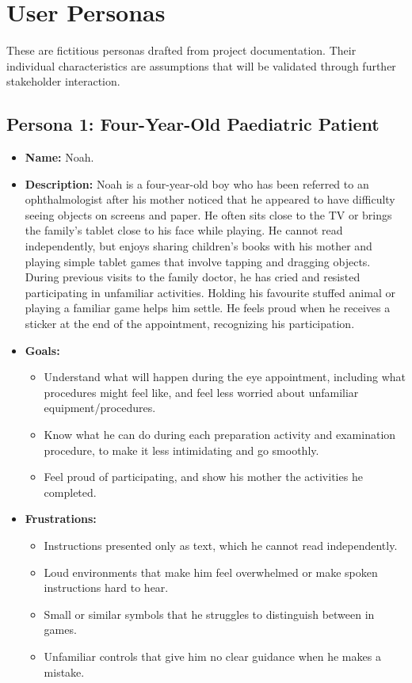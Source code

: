 \documentclass[10pt]{article}
\begin{document}
\section{User Personas}
\label{sec_Personas}
These are fictitious personas drafted from project documentation.
Their individual characteristics are assumptions that will be validated through further stakeholder interaction.

\subsection{Persona 1: Four-Year-Old Paediatric Patient}
\begin{itemize}
\item \textbf{Name:} Noah.

\item \textbf{Description:} Noah is a four-year-old boy who has been referred
to an ophthalmologist after his mother noticed that he appeared to have
difficulty seeing objects on screens and paper. He often sits close to the
TV or brings the family's tablet close to his face while playing.
He cannot read independently, but enjoys sharing children's books with his
mother and playing simple tablet games that involve tapping and
dragging objects. During previous visits to the family doctor, he has cried
and resisted participating in unfamiliar activities. Holding his favourite
stuffed animal or playing a familiar game helps him settle.
He feels proud when he receives a sticker at the end of the appointment,
recognizing his participation.

\item \textbf{Goals:}
\begin{itemize}
    \item Understand what will happen during the eye appointment, including what
    procedures might feel like, and feel less worried about unfamiliar equipment/procedures.
    \item Know what he can do during each preparation activity and examination
    procedure, to make it less intimidating and go smoothly.
    \item Feel proud of participating, and show his mother the activities he completed.
\end{itemize}

\item \textbf{Frustrations:}
\begin{itemize}
    \item Instructions presented only as text, which he cannot read independently.
    \item Loud environments that make him feel overwhelmed or make spoken
    instructions hard to hear.
    \item Small or similar symbols that he struggles to distinguish between
    in games.
    \item Unfamiliar controls that give him no clear guidance
    when he makes a mistake.
\end{itemize}


\end{itemize}
\end{document}
